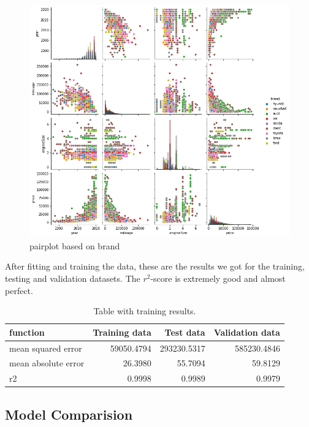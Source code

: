 \begin{figure}[h!]
    \begin{center}
        \includegraphics[width=0.7\linewidth]{images/pairplot_brand.png}
        \caption{pairplot based on brand}
        \label{fig:PairplotBrand}
    \end{center}
\end{figure}

After fitting and training the data, these are the results we got for the training, testing and validation datasets. The $r^2$-score is extremely good and almost perfect.

\begin{table}[h!]
    \begin{center}
        \caption{Table with training results.}
        \label{tab:training results}
        \begin{tabular}{l|r|r|r} %
            \textbf{function} & \textbf{Training data} & \textbf{Test data} & \textbf{Validation data}\\
            \hline
            mean squared error & 59050.4794 & 293230.5317 & 585230.4846\\
            mean absolute error & 26.3980 & 55.7094 & 59.8129\\
            r2 & 0.9998 & 0.9989 & 0.9979\\
        \end{tabular}
    \end{center}
\end{table}

\subsection{Model Comparision}
\newcommand{\linkUsedCarAkarshsinghh}{https://www.kaggle.com/akarshsinghh/car-price-prediction-score-93-random-forest}

